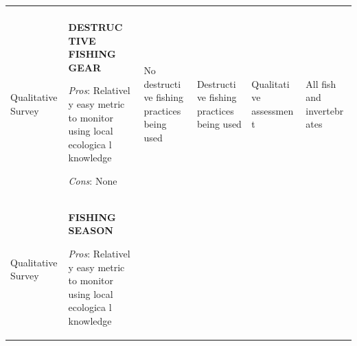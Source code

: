 \documentclass[]{book}
\begin{document}
\begin{longtable}[]{@{}llllll@{}}
\begin{minipage}[t]{0.14\columnwidth}
\strut
\end{minipage} & \begin{minipage}[t]{0.14\columnwidth}\raggedright\strut
\strut
\end{minipage} & \begin{minipage}[t]{0.14\columnwidth}\raggedright\strut
\strut
\end{minipage} & \begin{minipage}[t]{0.14\columnwidth}\raggedright\strut
\strut
\end{minipage} & \begin{minipage}[t]{0.14\columnwidth}\raggedright\strut
\strut
\end{minipage} & \begin{minipage}[t]{0.14\columnwidth}\raggedright\strut
\strut
\end{minipage}\tabularnewline
\begin{minipage}[t]{0.16\columnwidth}\raggedright\strut
Qualitative Survey\strut
\end{minipage} & \begin{minipage}[t]{0.16\columnwidth}\raggedright\strut
\textbf{DESTRUC TIVE FISHING GEAR}

\emph{Pros}: Relativel y easy metric to monitor using local ecologica l
knowledge

\emph{Cons}: None\strut
\end{minipage} & \begin{minipage}[t]{0.16\columnwidth}\raggedright\strut
No destructi ve fishing practices being used\strut
\end{minipage} & \begin{minipage}[t]{0.16\columnwidth}\raggedright\strut
Destructi ve fishing practices being used\strut
\end{minipage} & \begin{minipage}[t]{0.16\columnwidth}\raggedright\strut
Qualitati ve assessmen t\strut
\end{minipage} & \begin{minipage}[t]{0.16\columnwidth}\raggedright\strut
All fish and invertebr ates\strut
\end{minipage}\tabularnewline
\begin{minipage}[t]{0.16\columnwidth}\raggedright\strut
Qualitative Survey\strut
\end{minipage} & \begin{minipage}[t]{0.16\columnwidth}\raggedright\strut
\textbf{FISHING SEASON}

\emph{Pros}: Relativel y easy metric to monitor using local ecologica l
knowledge


\end{minipage}
\end{longtable}
\end{document}
